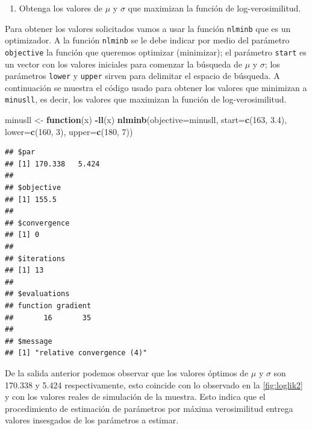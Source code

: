 \documentclass[10pt,]{krantz}
\makeatletter
\newenvironment{Shaded}{\begin{snugshade}}{\end{snugshade}}
\newcommand{\KeywordTok}[1]{\textcolor[rgb]{0.13,0.29,0.53}{\textbf{#1}}}
\newcommand{\DataTypeTok}[1]{\textcolor[rgb]{0.13,0.29,0.53}{#1}}
\newcommand{\DecValTok}[1]{\textcolor[rgb]{0.00,0.00,0.81}{#1}}
\newcommand{\FloatTok}[1]{\textcolor[rgb]{0.00,0.00,0.81}{#1}}
\newcommand{\StringTok}[1]{\textcolor[rgb]{0.31,0.60,0.02}{#1}}
\newcommand{\ControlFlowTok}[1]{\textcolor[rgb]{0.13,0.29,0.53}{\textbf{#1}}}
\newcommand{\OperatorTok}[1]{\textcolor[rgb]{0.81,0.36,0.00}{\textbf{#1}}}
\newcommand{\NormalTok}[1]{#1}
\providecommand{\tightlist}{%
  \setlength{\itemsep}{0pt}\setlength{\parskip}{0pt}}
\newenvironment{kframe}{%
\medskip{}
\setlength{\fboxsep}{.8em}
 \def\at@end@of@kframe{}%
 \ifinner\ifhmode%
  \def\at@end@of@kframe{\end{minipage}}%
  \begin{minipage}{\columnwidth}%
 \fi\fi%
 \def\FrameCommand##1{\hskip\@totalleftmargin \hskip-\fboxsep
 \colorbox{shadecolor}{##1}\hskip-\fboxsep
     \hskip-\linewidth \hskip-\@totalleftmargin \hskip\columnwidth}%
 \MakeFramed {\advance\hsize-\width
   \@totalleftmargin\z@ \linewidth\hsize
   \@setminipage}}%
 {\par\unskip\endMakeFramed%
 \at@end@of@kframe}
\renewenvironment{Shaded}{\begin{kframe}}{\end{kframe}}
\makeatother
\begin{document}
\begin{enumerate}
\def\labelenumi{\arabic{enumi})}
\setcounter{enumi}{2}
\tightlist
\item
  Obtenga los valores de \(\mu\) y \(\sigma\) que maximizan la función
  de log-verosimilitud.
\end{enumerate}

Para obtener los valores solicitados vamos a usar la función
\texttt{nlminb} que es un optimizador. A la función \texttt{nlminb} se
le debe indicar por medio del parámetro \texttt{objective} la función
que queremos optimizar (minimizar); el parámetro \texttt{start} es un
vector con los valores iniciales para comenzar la búsqueda de \(\mu\) y
\(\sigma\); los parámetros \texttt{lower} y \texttt{upper} sirven para
delimitar el espacio de búsqueda. A continuación se muestra el código
usado para obtener los valores que minimizan a \texttt{minusll}, es
decir, los valores que maximizan la función de log-verosimilitud.

\begin{Shaded}
\begin{Highlighting}[]
\NormalTok{minusll <-}\StringTok{ }\ControlFlowTok{function}\NormalTok{(x) }\OperatorTok{-}\KeywordTok{ll}\NormalTok{(x)}
\KeywordTok{nlminb}\NormalTok{(}\DataTypeTok{objective=}\NormalTok{minusll, }\DataTypeTok{start=}\KeywordTok{c}\NormalTok{(}\DecValTok{163}\NormalTok{, }\FloatTok{3.4}\NormalTok{),}
       \DataTypeTok{lower=}\KeywordTok{c}\NormalTok{(}\DecValTok{160}\NormalTok{, }\DecValTok{3}\NormalTok{), }\DataTypeTok{upper=}\KeywordTok{c}\NormalTok{(}\DecValTok{180}\NormalTok{, }\DecValTok{7}\NormalTok{))}
\end{Highlighting}
\end{Shaded}

\begin{verbatim}
## $par
## [1] 170.338   5.424
## 
## $objective
## [1] 155.5
## 
## $convergence
## [1] 0
## 
## $iterations
## [1] 13
## 
## $evaluations
## function gradient 
##       16       35 
## 
## $message
## [1] "relative convergence (4)"
\end{verbatim}

De la salida anterior podemos observar que los valores óptimos de
\(\mu\) y \(\sigma\) son 170.338 y 5.424 respectivamente, esto coincide
con lo observado en la \ref{fig:loglik2} y con los valores reales de
simulación de la muestra. Esto indica que el procedimiento de estimación
de parámetros por máxima verosimilitud entrega valores insesgados de los
parámetros a estimar.
\end{document}
